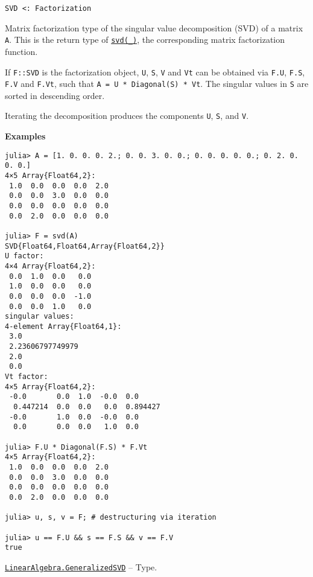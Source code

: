 \begin{adjustwidth}{2em}{0pt}


\begin{verbatim}
SVD <: Factorization
\end{verbatim}

Matrix factorization type of the singular value decomposition (SVD) of a matrix \texttt{A}. This is the return type of \hyperlink{6661056220970412040}{\texttt{svd(\_)}}, the corresponding matrix factorization function.

If \texttt{F::SVD} is the factorization object, \texttt{U}, \texttt{S}, \texttt{V} and \texttt{Vt} can be obtained via \texttt{F.U}, \texttt{F.S}, \texttt{F.V} and \texttt{F.Vt}, such that \texttt{A = U * Diagonal(S) * Vt}. The singular values in \texttt{S} are sorted in descending order.

Iterating the decomposition produces the components \texttt{U}, \texttt{S}, and \texttt{V}.

\textbf{Examples}


\begin{verbatim}
julia> A = [1. 0. 0. 0. 2.; 0. 0. 3. 0. 0.; 0. 0. 0. 0. 0.; 0. 2. 0. 0. 0.]
4×5 Array{Float64,2}:
 1.0  0.0  0.0  0.0  2.0
 0.0  0.0  3.0  0.0  0.0
 0.0  0.0  0.0  0.0  0.0
 0.0  2.0  0.0  0.0  0.0

julia> F = svd(A)
SVD{Float64,Float64,Array{Float64,2}}
U factor:
4×4 Array{Float64,2}:
 0.0  1.0  0.0   0.0
 1.0  0.0  0.0   0.0
 0.0  0.0  0.0  -1.0
 0.0  0.0  1.0   0.0
singular values:
4-element Array{Float64,1}:
 3.0
 2.23606797749979
 2.0
 0.0
Vt factor:
4×5 Array{Float64,2}:
 -0.0       0.0  1.0  -0.0  0.0
  0.447214  0.0  0.0   0.0  0.894427
 -0.0       1.0  0.0  -0.0  0.0
  0.0       0.0  0.0   1.0  0.0

julia> F.U * Diagonal(F.S) * F.Vt
4×5 Array{Float64,2}:
 1.0  0.0  0.0  0.0  2.0
 0.0  0.0  3.0  0.0  0.0
 0.0  0.0  0.0  0.0  0.0
 0.0  2.0  0.0  0.0  0.0

julia> u, s, v = F; # destructuring via iteration

julia> u == F.U && s == F.S && v == F.V
true
\end{verbatim}



\end{adjustwidth}
\hypertarget{16156328526785145806}{} 
\hyperlink{16156328526785145806}{\texttt{LinearAlgebra.GeneralizedSVD}}  -- {Type.}

